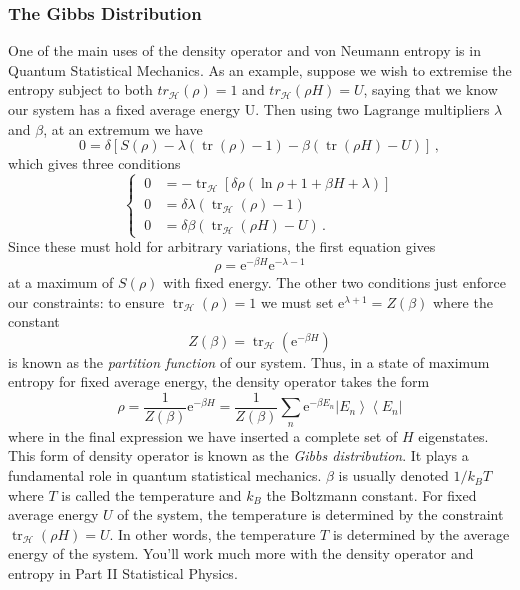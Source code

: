 \documentclass{article}
\theoremstyle{plain}\theoremheaderfont{\normalfont\itshape}\theorembodyfont{\rmfamily}\theoremseparator{.}\newtheorem*{rem}{Remark}\newtheorem*{ex}{Example}\newtheorem*{proof}{Proof}\newtheorem*{altp}{Alternative proof}
\theoremstyle{plain}\theoremheaderfont{\normalfont\bfseries}\theorembodyfont{\rmfamily}\theoremseparator{.}\newtheorem{thm}{Theorem}[section]\newtheorem{lem}[thm]{Lemma}\newtheorem{prop}[thm]{Proposition}\newtheorem*{cor}{Corollary}\newtheorem{defn}[thm]{Definition}\newtheorem{clm}[thm]{Claim}\newtheorem{clminproof}{Claim}
\theoremstyle{break}\theoremheaderfont{\normalfont\itshape}\theorembodyfont{\rmfamily}\theoremseparator{.\medskip}\newtheorem*{proofskip}{Proof}\newtheorem*{exs}{Examples}\newtheorem*{rems}{Remarks}
\theoremstyle{break}\theoremheaderfont{\normalfont\bfseries}\theorembodyfont{\rmfamily}\theoremseparator{.\medskip}\newtheorem{lemskip}[thm]{Lemma}\newtheorem{defnskip}[thm]{Definition}\newtheorem{propskip}[thm]{Proposition}\newtheorem{thmskip}[thm]{Theorem}
\numberwithin{equation}{section}
\newcommand{\ee}{\mathrm{e}}
\newcommand{\bra}[1]{\left\langle #1 \right|}
\newcommand{\ket}[1]{\left| #1 \right\rangle}
\newcommand{\hb}{\mathcal{H}}
\DeclareMathOperator{\tr}{tr}
\begin{document}
    \subsubsection{The Gibbs Distribution}
    One of the main uses of the density operator and von Neumann entropy is in Quantum Statistical Mechanics. As an example, suppose we wish to extremise the entropy subject to both \(tr_\hb(\rho)=1\) and \(tr_\hb(\rho H)=U\), saying that we know our system has a fixed average energy U. Then using two Lagrange multipliers \(\lambda\) and \(\beta\), at an extremum we have
    \begin{equation}
        0=\delta[S(\rho)-\lambda(\tr(\rho)-1)-\beta(\tr(\rho H)-U)]\,,
    \end{equation}
    which gives three conditions
    \begin{equation}
        \left\{\ \begin{aligned}
            0&=-\tr_\hb[\delta\rho(\ln\rho+1+\beta H+\lambda)]\\
            0&=\delta\lambda(\tr_\hb(\rho)-1)\\
            0&=\delta\beta(\tr_\hb(\rho H)-U)\,.
        \end{aligned}\right.
    \end{equation}
    Since these must hold for arbitrary variations, the first equation gives
    \begin{equation}
        \rho=\ee^{-\beta H}\ee^{-\lambda-1}
    \end{equation}
    at a maximum of \(S(\rho)\) with fixed energy. The other two conditions just enforce our constraints: to ensure \(\tr_\hb(\rho)=1\) we must set \(\ee^{\lambda+1}=Z(\beta)\) where the constant
    \begin{equation}
        Z(\beta)=\tr_\hb(\ee^{-\beta H})
    \end{equation}
    is known as the \textit{partition function} of our system. Thus, in a state of maximum entropy for fixed average energy, the density operator takes the form
    \begin{equation}
        \rho=\frac{1}{Z(\beta)}\ee^{-\beta H}=\frac{1}{Z(\beta)}\sum_n \ee^{-\beta E_n}\ket{E_n}\bra{E_n}
    \end{equation}
    where in the final expression we have inserted a complete set of \(H\) eigenstates. This form of density operator is known as the \textit{Gibbs distribution}. It plays a fundamental role in quantum statistical mechanics. \(\beta\) is usually denoted \(1/k_BT\) where \(T\) is called the temperature and \(k_B\) the Boltzmann constant. For fixed average energy \(U\) of the system, the temperature is determined by the constraint \(\tr_\hb(\rho H)=U\). In other words, the temperature \(T\) is determined by the average energy of the system. You'll work much more with the density operator and entropy in Part II Statistical Physics.
    
\end{document}
